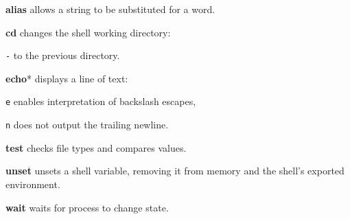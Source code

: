 \begin{compactenum}
	\item [\cmdvar] \textbf{alias} allows a string to be substituted for a word.
	\item [\cmdvar] \textbf{cd} changes the shell working directory:
	\item [\texttt{-}] to the previous directory.
	\item [\cmdvar] \textbf{echo}* displays a line of text:
	\item [\texttt{e}] enables interpretation of backslash escapes,
	\item [\texttt{n}] does not output the trailing newline.
	\item [\cmdvar] \textbf{test} checks file types and compares values.
	\item [\cmdvar] \textbf{unset} unsets a shell variable, removing it from memory and the shell's exported environment.
	\item [\cmdvar] \textbf{wait} waits for process to change state.
\end{compactenum}
